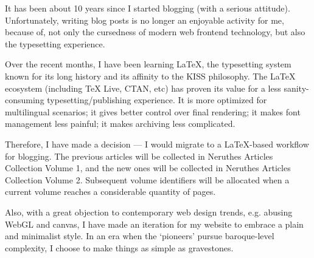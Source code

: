 
It has been about 10 years since I started blogging (with a serious attitude).
Unfortunately, writing blog posts is no longer an enjoyable activity for me,
because of, not only the cursedness of modern web frontend technology,
but also the typesetting experience.

Over the recent months, I have been learning \LaTeX{},
the typesetting system known for its long history and its affinity to the KISS philosophy.
The \LaTeX{} ecosystem (including \TeX{} Live, CTAN, etc)
has proven its value for a less sanity-consuming typesetting/publishing experience.
It is more optimized for multilingual scenarios; it gives better control over final rendering;
it makes font management less painful; it makes archiving less complicated.

Therefore, I have made a decision ---
I would migrate to a \LaTeX{}-based workflow for blogging.
The previous articles will be collected in Neruthes Articles Collection Volume 1,
and the new ones will be collected in Neruthes Articles Collection Volume 2.
Subsequent volume identifiers will be allocated when a current volume reaches a considerable quantity of pages.

Also, with a great objection to contemporary web design trends,
e.g. abusing WebGL and canvas,
I have made an iteration for my website to embrace a plain and minimalist style.
In an era when the `pioneers' pursue baroque-level complexity,
I choose to make things as simple as gravestones.
